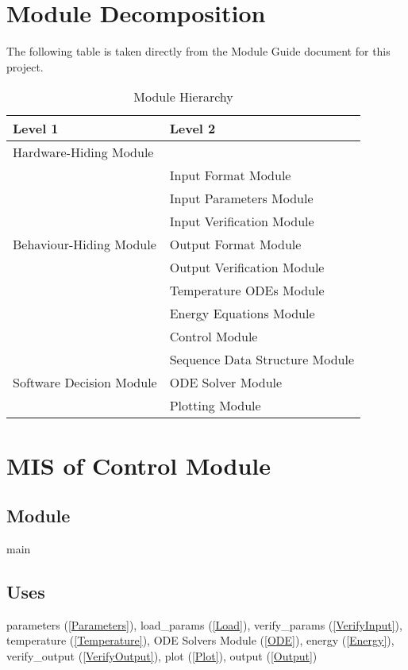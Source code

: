 \documentclass[12pt]{article}
\begin{document}
\section{Module Decomposition}
The following table is taken directly from the Module Guide document for this project.
\begin{table}[!h]
	\centering
	\begin{tabular}{p{} p{}}
		\toprule
		\textbf{Level 1} & \textbf{Level 2}\\
		\midrule
		
		{Hardware-Hiding Module} & ~ \\
		\midrule
		
		\multirow{7}{0.3\textwidth}{Behaviour-Hiding Module} & Input Format Module\\
		& Input Parameters Module\\
		& Input Verification Module\\
		& Output Format Module\\
		& Output Verification Module\\
		& Temperature ODEs Module\\
		& Energy Equations Module\\ 
		& Control Module\\
		\midrule
		
		\multirow{3}{0.3\textwidth}{Software Decision Module} & {Sequence Data Structure Module}\\
		& ODE Solver Module\\
		& Plotting Module\\
		\bottomrule
		
	\end{tabular}
	\caption{Module Hierarchy}
	\label{TblMH}
\end{table}

\section{MIS of Control Module} \label{Main}
\subsection{Module}
main
\subsection{Uses}
parameters (\ref{Parameters}), load\_params (\ref{Load}), verify\_params (\ref{VerifyInput}), temperature (\ref{Temperature}), ODE Solvers Module (\ref{ODE}), energy (\ref{Energy}), verify\_output (\ref{VerifyOutput}), plot (\ref{Plot}), output (\ref{Output})
\end{document}
